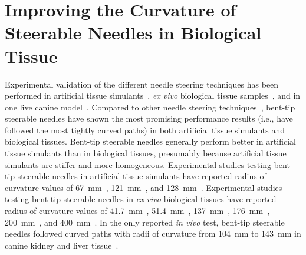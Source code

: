 \chapter[Improving Needle Curvature]{Improving the Curvature of Steerable Needles in Biological Tissue}
Experimental validation of the different needle steering techniques has been performed in artificial tissue simulants~\cite{DiMaio2005,Mallapragada2009,Okazawa2005,Ko2013,Patil2014,Swaney2013,Ayvali2012,Datla2014,Ryu2014,Rucker2013,vandeBerg2015}, \textit{ex vivo} biological tissue samples~\cite{Glozman2007,Burdette2010,Patil2014,Swaney2013,Majewicz2012,Rucker2013}, and in one live canine model~\cite{Majewicz2012}. Compared to other needle steering techniques~\cite{DiMaio2005,Mallapragada2009,Okazawa2005,Ko2013,Ryu2014}, bent-tip steerable needles have shown the most promising performance results (i.e., have followed the most tightly curved paths) in both artificial tissue simulants and biological tissues. Bent-tip steerable needles generally perform better in artificial tissue simulants than in biological tissues, presumably because artificial tissue simulants are stiffer and more homogeneous. Experimental studies testing bent-tip steerable needles in artificial tissue simulants have reported radius-of-curvature values of 67~mm~\cite{Patil2014}, 121~mm~\cite{Swaney2013}, and 128~mm~\cite{Rucker2013}. Experimental studies testing bent-tip steerable needles in \textit{ex vivo} biological tissues have reported radius-of-curvature values of 41.7~mm~\cite{Majewicz2010}, 51.4~mm~\cite{Adebar2014}, 137~mm~\cite{Patil2014}, 176~mm~\cite{Swaney2013}, 200~mm~\cite{Majewicz2012}, and 400~mm~\cite{Rucker2013}. In the only reported \textit{in vivo} test, bent-tip steerable needles followed curved paths with radii of curvature from 104~mm to 143~mm in canine kidney and liver tissue~\cite{Majewicz2012}.

